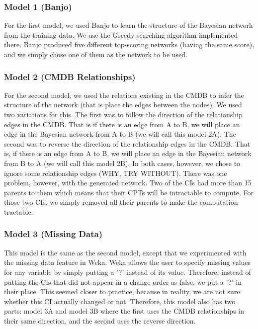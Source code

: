 \documentclass{article}
\begin{document}
\subsubsection{Model 1 (Banjo)}
\label{sec:model1}

For the first model, we used Banjo to learn the structure of the Bayesian network from the training data. We use the Greedy searching algorithm implemented
there. Banjo produced five different top-scoring networks (having the same score), and we simply chose one of them as the network to be used.


\subsubsection{Model 2 (CMDB Relationships)}

For the second model, we used the relations existing in the CMDB to infer the structure of the network (that is place the edges between the nodes). We used two
variations for this. The first was to follow the direction of the relationship edges in the CMDB. That is if there is an edge from A to B, we will place an
edge in the Bayesian network from A to B (we will call this model 2A). The second was to reverse the direction of the relationship edges in the CMDB. That is,
if there is an edge from A to B, we will place an edge in the Bayesian network from B to A (we will call this model 2B). In both cases, however, we chose to
ignore some relationship edges (WHY, TRY WITHOUT). There was one problem, however, with the generated network. Two of the CIs had more than 15 parents to them
which means that their CPTs will be intractable to compute. For those two CIs, we simply removed all their parents to make the computation tractable.

\subsubsection{Model 3 (Missing Data)}

This model is the same as the second model, except that we experimented with the missing data feature in Weka. Weka allows the user to specify missing values
for any variable by simply putting a '?' instead of its value. Therefore, instead of putting the CIs that did not appear in a change order as false, we put a
'?' in their place. This seemed closer to practice, because in reality, we are not sure whether this CI actually changed or not. Therefore, this model also has
two parts: model 3A and model 3B where the first uses the CMDB relationships in their same direction, and the second uses the reverse direction.
\end{document}
